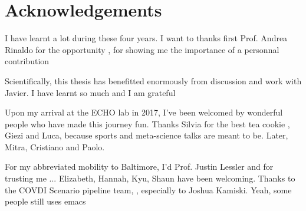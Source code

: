 




 \chapter{Acknowledgements}
 I have learnt a lot during these four years. I want to thanks first Prof. Andrea Rinaldo for the opportunity , for showing me the importance of a personnal contribution  
 
 Scientifically, this thesis has benefitted enormously from discussion and work with Javier. I have learnt so much and I am grateful
 
 Upon my arrival at the ECHO lab in 2017, I've been welcomed by wonderful people who have made this journey fun. Thanks Silvia for the best tea cookie , Giezi and Luca, because sports and meta-science talks are meant to be. Later, Mitra, Cristiano and Paolo.
 
 
 For my abbreviated mobility to Baltimore, I'd Prof. Justin Lessler and for trusting me  ... Elizabeth, Hannah, Kyu, Shaun have been welcoming. Thanks to the COVDI Scenario pipeline team, , especially to Joshua Kamiski. Yeah, some people still uses emacs
 
